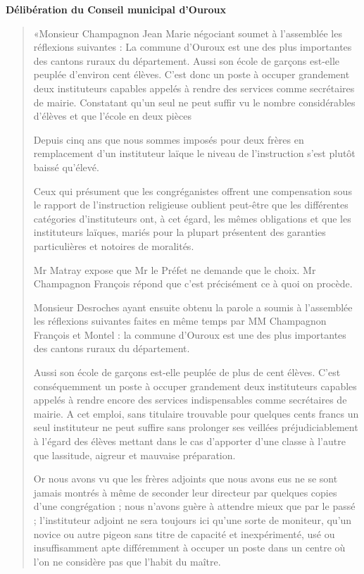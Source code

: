 \textbf{Délibération du Conseil municipal d'Ouroux}

\begin{quote}
«Monsieur Champagnon Jean Marie négociant soumet à l'assemblée les réflexions suivantes : La commune d'Ouroux est une des plus importantes des cantons ruraux du département. Aussi son école de garçons est-elle peuplée d'environ cent élèves. C'est donc un poste à occuper grandement deux instituteurs capables appelés à rendre des services comme secrétaires de mairie. Constatant qu'un seul ne peut suffir vu le nombre considérables d'élèves et que l'école en deux pièces

Depuis cinq ans que nous sommes imposés pour deux frères en remplacement d'un instituteur laïque le niveau de l'instruction s'est plutôt baissé qu'élevé.

Ceux qui présument que les congréganistes offrent une compensation sous le rapport de l'instruction religieuse oublient peut-être que les différentes catégories d'instituteurs ont, à cet égard, les mêmes obligations et que les instituteurs laïques, mariés pour la plupart présentent des garanties particulières et notoires de moralités.

Mr Matray expose que Mr le Préfet ne demande que le choix. Mr Champagnon François répond que c'est précisément ce à quoi on procède.

Monsieur Desroches ayant ensuite obtenu la parole a soumis à l'assemblée les réflexions suivantes faites en même temps par MM Champagnon François et Montel : la commune d'Ouroux est une des plus importantes des cantons ruraux du département.

Aussi son école de garçons est-elle peuplée de plus de cent élèves. C'est conséquemment un poste à occuper grandement deux instituteurs capables appelés à rendre encore des services indispensables comme secrétaires de mairie. A cet emploi, sans titulaire trouvable pour quelques cents francs un seul instituteur ne peut suffire sans prolonger ses veillées préjudiciablement à l'égard des élèves mettant dans le cas d'apporter d'une classe à l'autre que lassitude, aigreur et mauvaise préparation.

Or nous avons vu que les frères adjoints que nous avons eus ne se sont jamais montrés à même de seconder leur directeur par quelques copies d'une congrégation ; nous n'avons guère à attendre mieux que par le passé ; l'instituteur adjoint ne sera toujours ici qu'une sorte de moniteur, qu'un novice ou autre pigeon sans titre de capacité et inexpérimenté, usé ou insuffisamment apte différemment à occuper un poste dans un centre où l'on ne considère pas que l'habit du maître.


\end{quote}

